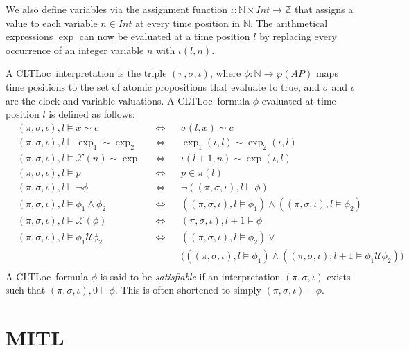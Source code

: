 \documentclass[a4paper,11pt]{report}
\theoremstyle{definition}
\newcommand{\cltloc}{CLTLoc}
\begin{document}
We also define variables via the assignment function
$\iota : \mathbb{N} \times Int \rightarrow \mathbb{Z}$ that assigns a value to
each variable $n \in Int$ at every time position in $\mathbb{N}$. The
arithmetical expressions $\exp$ can now be evaluated at a time position $l$ by
replacing every occurrence of an integer variable $n$ with $\iota(l,n)$.

A \cltloc\ interpretation is the triple $(\pi, \sigma, \iota)$, where
$\phi: \mathbb{N} \rightarrow \wp(AP)$ maps time positions to the set of atomic
propositions that evaluate to true, and $\sigma$ and $\iota$ are the clock and
variable valuations. A \cltloc\ formula $\phi$ evaluated at time position $l$ is
defined as follows:
\begin{align*}
  &(\pi,\sigma,\iota),l \vDash x \sim c && \Leftrightarrow && \sigma(l,x) \sim c \\
  &(\pi,\sigma,\iota),l \vDash \exp_{1} \sim \exp_{2} && \Leftrightarrow && \exp_{1}(\iota,l) \sim \exp_{2}(\iota,l) \\
  &(\pi,\sigma,\iota),l \vDash \mathcal{X}(n) \sim \exp && \Leftrightarrow && \iota(l{+}1,n) \sim \exp(\iota,l) \\
  &(\pi,\sigma,\iota),l \vDash p && \Leftrightarrow && p \in \pi(l) \\
  &(\pi,\sigma,\iota),l \vDash \neg \phi && \Leftrightarrow && \neg ((\pi,\sigma,\iota),l \vDash \phi) \\
  &(\pi,\sigma,\iota),l \vDash \phi_{1} \land \phi_{2} && \Leftrightarrow &&((\pi,\sigma,\iota),l \vDash \phi_{1}) \land ((\pi,\sigma,\iota),l \vDash \phi_{2}) \\
  &(\pi,\sigma,\iota),l \vDash \mathcal{X}(\phi) && \Leftrightarrow && (\pi,\sigma,\iota),l{+}1 \vDash \phi \\
  &(\pi,\sigma,\iota),l \vDash \phi_{1} \mathcal{U} \phi_{2} && \Leftrightarrow &&((\pi,\sigma,\iota),l \vDash \phi_{2}) \lor \\
  &&&&& \bigg(((\pi,\sigma,\iota),l \vDash \phi_{1}) \land ((\pi,\sigma,\iota),l{+}1 \vDash \phi_{1} \mathcal{U} \phi_{2}) \bigg) \\
\end{align*}
A \cltloc\ formula $\phi$ is said to be \emph{satisfiable} if an interpretation
$(\pi,\sigma,\iota)$ exists such that $(\pi,\sigma,\iota),0 \vDash \phi$. This
is often shortened to simply $(\pi,\sigma,\iota) \vDash \phi$.


\section{MITL}\label{mitl}
\end{document}
